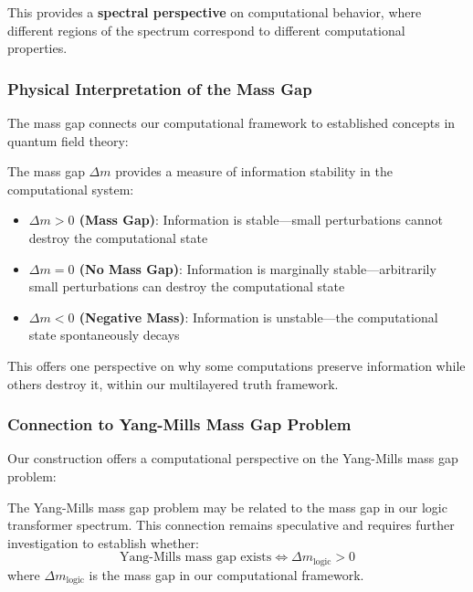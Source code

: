 This provides a \textbf{spectral perspective} on computational behavior, where different regions of the spectrum correspond to different computational properties.

\subsubsection{Physical Interpretation of the Mass Gap}

The mass gap connects our computational framework to established concepts in quantum field theory:

\begin{definition}
\label{def:mass-gap-stability}
The mass gap $\Delta m$ provides a measure of information stability in the computational system:
\begin{itemize}
\item \textbf{$\Delta m > 0$ (Mass Gap)}: Information is stable—small perturbations cannot destroy the computational state
\item \textbf{$\Delta m = 0$ (No Mass Gap)}: Information is marginally stable—arbitrarily small perturbations can destroy the computational state
\item \textbf{$\Delta m < 0$ (Negative Mass)}: Information is unstable—the computational state spontaneously decays
\end{itemize}
\end{definition}

This offers one perspective on why some computations preserve information while others destroy it, within our multilayered truth framework.

\subsubsection{Connection to Yang-Mills Mass Gap Problem}

Our construction offers a computational perspective on the Yang-Mills mass gap problem:

\begin{remark}
\label{rem:computational-yang-mills}
The Yang-Mills mass gap problem may be related to the mass gap in our logic transformer spectrum. This connection remains speculative and requires further investigation to establish whether:
\[
\text{Yang-Mills mass gap exists} \Leftrightarrow \Delta m_{\text{logic}} > 0
\]
where $\Delta m_{\text{logic}}$ is the mass gap in our computational framework.
\end{remark}

